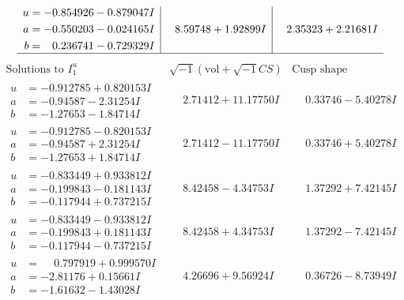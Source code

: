 \documentclass[1p]{elsarticle_modified}
\theoremstyle{definition}
\newcommand{\I}{\sqrt{-1}}
\begin{document}
$$\begin{array}{c|c|c}
\begin{aligned}
u &= -0.854926 - 0.879047 I \\
a &= -0.550203 - 0.024165 I \\
b &= \phantom{-}0.236741 - 0.729329 I\end{aligned}
 & \phantom{-}8.59748 + 1.92899 I & \phantom{-}2.35323 + 2.21681 I\\
 \hline 
 \end{array}$$\newpage$$\begin{array}{c|c|c}  
\text{Solutions to }I^u_{1}& \I (\text{vol} + \sqrt{-1}CS) & \text{Cusp shape}\\
 \hline 
\begin{aligned}
u &= -0.912785 + 0.820153 I \\
a &= -0.94587 - 2.31254 I \\
b &= -1.27653 - 1.84714 I\end{aligned}
 & \phantom{-}2.71412 + 11.17750 I & \phantom{-}0.33746 - 5.40278 I \\ \hline\begin{aligned}
u &= -0.912785 - 0.820153 I \\
a &= -0.94587 + 2.31254 I \\
b &= -1.27653 + 1.84714 I\end{aligned}
 & \phantom{-}2.71412 - 11.17750 I & \phantom{-}0.33746 + 5.40278 I \\ \hline\begin{aligned}
u &= -0.833449 + 0.933812 I \\
a &= -0.199843 - 0.181143 I \\
b &= -0.117944 + 0.737215 I\end{aligned}
 & \phantom{-}8.42458 - 4.34753 I & \phantom{-}1.37292 + 7.42145 I \\ \hline\begin{aligned}
u &= -0.833449 - 0.933812 I \\
a &= -0.199843 + 0.181143 I \\
b &= -0.117944 - 0.737215 I\end{aligned}
 & \phantom{-}8.42458 + 4.34753 I & \phantom{-}1.37292 - 7.42145 I \\ \hline\begin{aligned}
u &= \phantom{-}0.797919 + 0.999570 I \\
a &= -2.81176 + 0.15661 I \\
b &= -1.61632 - 1.43028 I\end{aligned}
 & \phantom{-}4.26696 + 9.56924 I & \phantom{-}0.36726 - 8.73949 I \\ \hline\begin{aligned}

\end{aligned}
\end{array}$$
\end{document}
